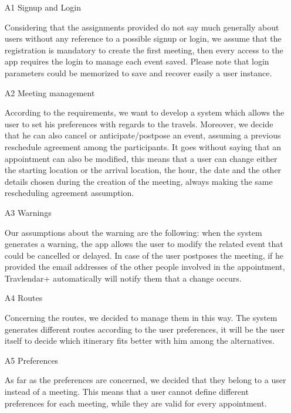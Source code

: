 
\begin{itemize}

\item[A1] Signup and Login

Considering that the assignments provided do not say much generally about users without any reference to a possible signup or login, we assume that the registration is mandatory to create the first meeting, then every access to the app requires the login to manage each event saved. Please note that login parameters could be memorized to save and recover easily a user instance.

\item[A2] Meeting management

According to the requirements, we want to develop a system which allows the user to set his preferences with regards to the travels. Moreover, we decide that he can also cancel or anticipate/postpose an event, assuming a previous reschedule agreement among the participants. It goes without saying that an appointment can also be modified, this means that a user can change either the starting location or the arrival location, the hour, the date and the other details chosen during the creation of the meeting, always making the same rescheduling agreement assumption. 

\item[A3] Warnings

Our assumptions about the warning are the following: when the system generates a warning, the app allows the user to modify the related event that could be cancelled or delayed. In case of the user postposes the meeting, if he provided the email addresses of the other people involved in the appointment, Travlendar+ automatically will notify them that a change occurs. 

\item[A4] Routes

Concerning the routes, we decided to manage them in this way. 
The system generates different routes according to the user preferences, it will be the user itself to decide which itinerary fits better with him among the alternatives. 

\item[A5] Preferences

As far as the preferences are concerned, we decided that they belong to a user instead of a meeting. This means that a user cannot define different preferences for each meeting, while they are valid for every appointment.

\end{itemize}

 
